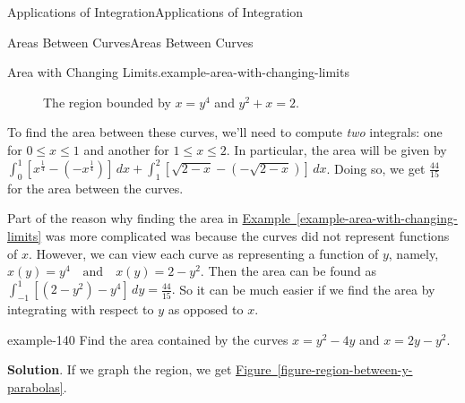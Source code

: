 \documentclass[10pt,]{book}
\numberwithin{equation}{section}
\begin{document}
\begin{chapterptx}{Applications of Integration}{}{Applications of Integration}{}{}
\begin{sectionptx}{Areas Between Curves}{}{Areas Between Curves}{}{}
\begin{example}{Area with Changing Limits.}{example-area-with-changing-limits}
\begin{figure}
{
}
\caption{The region bounded by \(x = y^{4}\) and \(y^{2} + x = 2\).\label{figure-graph-between-x-curves}}
\end{figure}
\hypertarget{p-622}{}%
To find the area between these curves, we'll need to compute \emph{two} integrals: one for \(0\leq x\leq 1\) and another for \(1\leq x\leq 2\). In particular, the area will be given by \(\int_{0}^{1}[x^{\frac{1}{4}} - (-x^{\frac{1}{4}})]\,dx + \int_{1}^{2}[\sqrt{2 - x} - (-\sqrt{2 - x})]\,dx\). Doing so, we get \(\frac{44}{15}\) for the area between the curves.%
\end{example}
\hypertarget{p-623}{}%
Part of the reason why finding the area in \hyperref[example-area-with-changing-limits]{Example~\ref{example-area-with-changing-limits}} was more complicated was because the curves did not represent functions of \(x\). However, we can view each curve as representing a function of \(y\), namely, \(x(y) = y^{4} \quad\text{and}\quad x(y) = 2 - y^{2}.\) Then the area can be found as \(\int_{-1}^{1}[(2 - y^{2}) - y^{4}]\,dy = \frac{44}{15}.\) So it can be much easier if we find the area by integrating with respect to \(y\) as opposed to \(x\).%
\begin{example}{}{example-140}%
\hypertarget{p-624}{}%
Find the area contained by the curves \(x = y^{2} - 4y\) and \(x = 2y - y^{2}\).%
\par\smallskip%
\noindent\textbf{Solution}.\hypertarget{solution-136}{}\quad%
\hypertarget{p-625}{}%
If we graph the region, we get \hyperref[figure-region-between-y-parabolas]{Figure~\ref{figure-region-between-y-parabolas}}.%
\begin{figure}
\centering
{
}
\end{figure}
\end{example}
\end{sectionptx}
\end{chapterptx}
\end{document}

